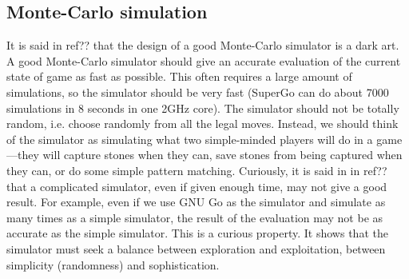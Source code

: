 \subsection{Monte-Carlo simulation}
It is said in ref?? that the design of a good Monte-Carlo simulator is a dark art. A good Monte-Carlo simulator should give an accurate evaluation of the current state of game as fast as possible. This often requires a large amount of simulations, so the simulator should be very fast (SuperGo can do about 7000 simulations in 8 seconds in one 2GHz core). The simulator should not be totally random, i.e. choose randomly from all the legal moves. Instead, we should think of the simulator as simulating what two simple-minded players will do in a game---they will capture stones when they can, save stones from being captured when they can, or do some simple pattern matching. Curiously, it is said in in ref?? that a complicated simulator, even if given enough time, may not give a good result. For example, even if we use GNU Go as the simulator and simulate as many times as a simple simulator, the result of the evaluation may not be as accurate as the simple simulator. This is a curious property. It shows that the simulator must seek a balance between exploration and exploitation, between simplicity (randomness) and sophistication.

